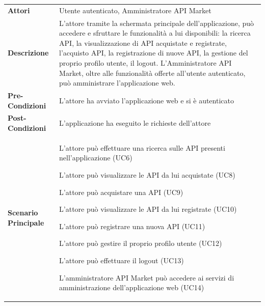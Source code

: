 \begin{longtable}{ l | p{11cm}}
	\hline
	\rowcolor{Gray}
	 \multicolumn{2}{c}{UC2 - Main post-autenticazione} \\
	 \hline
	\textbf{Attori} & Utente autenticato, Amministratore API Market \\
	\textbf{Descrizione} & L'attore tramite la schermata principale
	dell'applicazione, può accedere e sfruttare le funzionalità a lui disponibili: la ricerca API, la visualizzazione di API acquistate e registrate, l'acquisto API, la registrazione di nuove API, la gestione del proprio profilo utente, il logout. 
	L'Amministratore API Market, oltre alle funzionalità offerte all'utente autenticato, può amministrare l'applicazione web.  \\
	\textbf{Pre-Condizioni} & L'attore ha avviato l'applicazione web e si è autenticato \\
	\textbf{Post-Condizioni} & L'applicazione ha eseguito le richieste dell'attore \\
	\textbf{Scenario Principale} & 
	\begin{enumerate*}[label=(\arabic*.),itemjoin={\newline}]
		\item L'attore può effettuare una ricerca sulle API presenti nell'applicazione
(UC6)
		\item L'attore può visualizzare le API da lui acquistate (UC8)
		\item L'attore può acquistare una API (UC9)
		\item L'attore può visualizzare le API da lui registrate (UC10)
		\item L'attore può registrare una nuova API (UC11)
		\item L'attore può gestire il proprio profilo utente (UC12)
		\item L'attore può effettuare il logout (UC13)
		\item L'amministratore API Market può accedere ai servizi di amministrazione dell'applicazione web (UC14)
	\end{enumerate*}\\
\end{longtable}